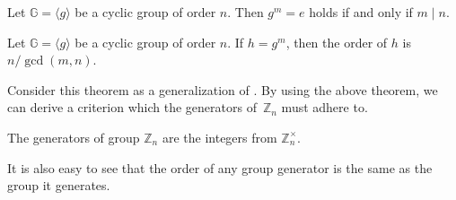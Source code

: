 \documentclass[../lecture-notes-148x210.tex]{subfiles}
\begin{document}
\begin{lemma}\label{lemma:cyclic-group-order}
    Let $\mathbb{G}=\langle g \rangle$ be a cyclic group of order $n$. Then
    $g^{m} = e$ holds if and only if $m \mid n$.
\end{lemma}

\begin{theorem}
    Let $\mathbb{G}=\langle g \rangle$ be a cyclic group of order $n$. If $h =
    g^m$, then the order of $h$ is $n/\gcd(m, n)$. 
\end{theorem}

Consider this theorem as a generalization of . By
using the above theorem, we can derive a criterion which the generators
of~$\mathbb{Z}_n$ must adhere to.

\begin{corollary} \label{cor:}
    The generators of group $\mathbb{Z}_n$ are the integers from $\mathbb{Z}_n^{\times}$.
\end{corollary}

It is also easy to see that the order of any group generator is the same as the group it generates.
\end{document}

